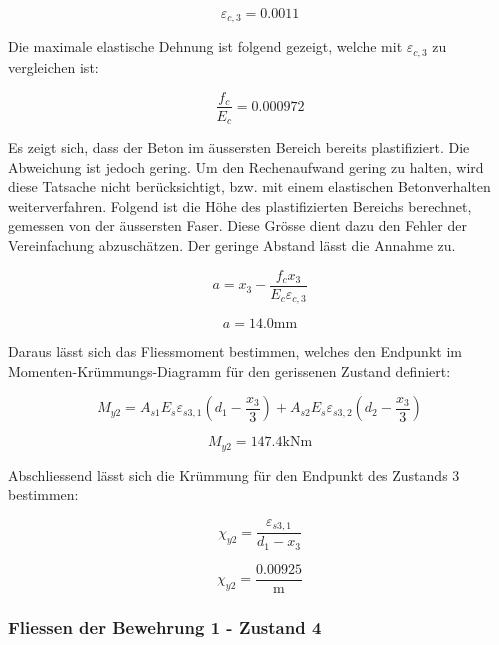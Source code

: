 \documentclass[
  12pt,
  letterpaper,
  egregdoesnotlikesansseriftitles]{scrreprt}
\begin{document}
\begin{equation}\varepsilon_{c,3} = 0.0011\end{equation}

Die maximale elastische Dehnung ist folgend gezeigt, welche mit
\(\varepsilon_{c,3}\) zu vergleichen ist:

\begin{equation}\frac{f_{c}}{E_{c}} = 0.000972\end{equation}

Es zeigt sich, dass der Beton im äussersten Bereich bereits
plastifiziert. Die Abweichung ist jedoch gering. Um den Rechenaufwand
gering zu halten, wird diese Tatsache nicht berücksichtigt, bzw. mit
einem elastischen Betonverhalten weiterverfahren. Folgend ist die Höhe
des plastifizierten Bereichs berechnet, gemessen von der äussersten
Faser. Diese Grösse dient dazu den Fehler der Vereinfachung
abzuschätzen. Der geringe Abstand lässt die Annahme zu.

\begin{equation}a = x_{3} - \frac{f_{c} x_{3}}{E_{c} \varepsilon_{c,3}}\end{equation}

\begin{equation}a = 14.0 \text{mm}\end{equation}

Daraus lässt sich das Fliessmoment bestimmen, welches den Endpunkt im
Momenten-Krümmungs-Diagramm für den gerissenen Zustand definiert:

\begin{equation}M_{y 2} = A_{s 1} E_{s} \varepsilon_{s3,1} \left(d_{1} - \frac{x_{3}}{3}\right) + A_{s 2} E_{s} \varepsilon_{s3,2} \left(d_{2} - \frac{x_{3}}{3}\right)\end{equation}

\begin{equation}M_{y 2} = 147.4 \text{kN} \text{m}\end{equation}

Abschliessend lässt sich die Krümmung für den Endpunkt des Zustands 3
bestimmen:

\begin{equation}\chi_{y2} = \frac{\varepsilon_{s3,1}}{d_{1} - x_{3}}\end{equation}

\begin{equation}\chi_{y2} = \frac{0.00925}{\text{m}}\end{equation}

\hypertarget{fliessen-der-bewehrung-1---zustand-4}{%
\subsubsection{Fliessen der Bewehrung 1 - Zustand
4}\label{fliessen-der-bewehrung-1---zustand-4}}
\end{document}
